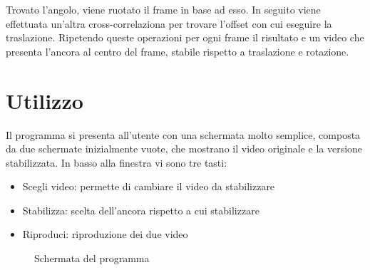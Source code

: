 \documentclass[12pt]{article}
\begin{document}
Trovato l'angolo, viene ruotato il frame in base ad esso. In seguito viene effettuata un'altra cross-correlaziona per trovare l'offset con cui eseguire la traslazione. Ripetendo queste operazioni per ogni frame il risultato e un video che presenta l'ancora al centro del frame, stabile rispetto a traslazione e rotazione.

\clearpage
\section{Utilizzo}
Il programma si presenta all'utente con una schermata molto semplice, composta da due
schermate inizialmente vuote, che mostrano il video originale e la versione stabilizzata.
In basso alla finestra vi sono tre tasti:
\begin{itemize}
	\item Scegli video: permette di cambiare il video da stabilizzare
	\item Stabilizza: scelta dell'ancora rispetto a cui stabilizzare
	\item Riproduci: riproduzione dei due video
\end{itemize}

\begin{figure}[h!]
	\begin{center}
	  \caption{Schermata del programma}
	\end{center}
\end{figure}
\end{document}
